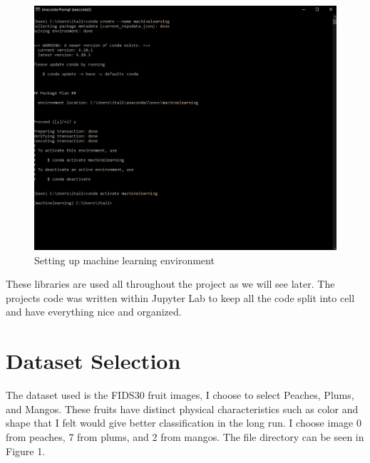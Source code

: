 \documentclass[conference]{IEEEtran}
\begin{document}
\begin{figure}[h]
  \centering
  \includegraphics[width=\linewidth]{Anaconda_env.png}
  \caption{Setting up machine learning environment}
\end{figure}

These libraries are used all throughout the project as we will see later. The projects code was written within Jupyter Lab to keep all the code split into cell and have everything nice and organized.

\section{Dataset Selection}
The dataset used is the FIDS30 fruit images, I choose to select Peaches, Plums, and Mangos. These fruits have distinct physical characteristics such as color and shape that I felt would give better classification in the long run. I choose image 0 from peaches, 7 from plums, and 2 from mangos. The file directory can be seen in Figure 1.
\end{document}
